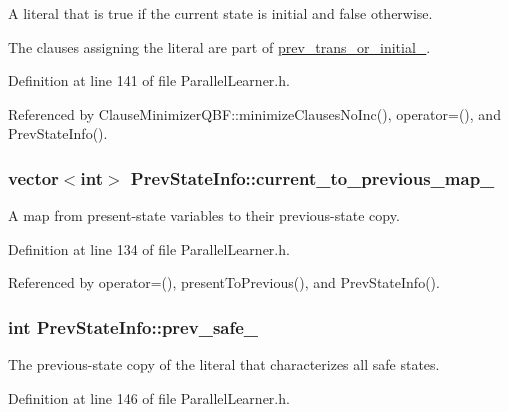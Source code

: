 A literal that is true if the current state is initial and false otherwise. 

The clauses assigning the literal are part of \hyperlink{classPrevStateInfo_a3301f7d909263e78ef990173d69f7036}{prev\-\_\-trans\-\_\-or\-\_\-initial\-\_\-}. 

Definition at line 141 of file Parallel\-Learner.\-h.



Referenced by Clause\-Minimizer\-Q\-B\-F\-::minimize\-Clauses\-No\-Inc(), operator=(), and Prev\-State\-Info().

\hypertarget{classPrevStateInfo_a98e6e65c17d5d1e535d509816b466257}{
\subsubsection[{current\-\_\-to\-\_\-previous\-\_\-map\-\_\-}]{\setlength{\rightskip}{0pt plus 5cm}vector$<$int$>$ Prev\-State\-Info\-::current\-\_\-to\-\_\-previous\-\_\-map\-\_\-}}\label{classPrevStateInfo_a98e6e65c17d5d1e535d509816b466257}


A map from present-\/state variables to their previous-\/state copy. 



Definition at line 134 of file Parallel\-Learner.\-h.



Referenced by operator=(), present\-To\-Previous(), and Prev\-State\-Info().

\hypertarget{classPrevStateInfo_a4c8813c99307790e87b994639cade0ed}{
\subsubsection[{prev\-\_\-safe\-\_\-}]{\setlength{\rightskip}{0pt plus 5cm}int Prev\-State\-Info\-::prev\-\_\-safe\-\_\-}}\label{classPrevStateInfo_a4c8813c99307790e87b994639cade0ed}


The previous-\/state copy of the literal that characterizes all safe states. 



Definition at line 146 of file Parallel\-Learner.\-h.



